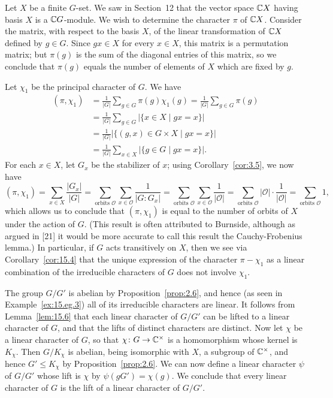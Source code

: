 \documentclass[../Odyssey_Project.tex]{subfiles}
\begin{document}
\begin{example}
\label{ex:15.eg.4}
Let $X$ be a finite $G$-set. We saw in Section~12 that the vector space $\mathbb{C} X$ having basis $X$ is a $\mathbb{C} G$-module. We wish to determine the character $\pi$ of $\mathbb{C} X$. Consider the matrix, with respect to the basis $X$, of the linear transformation of $\mathbb{C} X$ defined by $g \in G$. Since $gx \in X$ for every $x \in X$, this matrix is a permutation matrix; but $\pi(g)$ is the sum of the diagonal entries of this matrix, so we conclude that $\pi(g)$ equals the number of elements of $X$ which are fixed by $g$.

Let $\chi_1$ be the principal character of $G$. We have
\begin{align*}
    (\pi, \chi_1) &= \frac{1}{|G|}\sum_{g \in G} \pi(g)\chi_1(g) = \frac{1}{|G|}\sum_{g \in G} \pi(g) \\
    &= \frac{1}{|G|}\sum_{g \in G} |\{x \in X \mid gx = x\}| \\
    &= \frac{1}{|G|}|\{(g, x) \in G \times X \mid gx = x\}| \\
    &= \frac{1}{|G|}\sum_{x \in X} |\{g \in G \mid gx = x\}|.
\end{align*}
For each $x \in X$, let $G_x$ be the stabilizer of $x$; using Corollary~\ref{cor:3.5}, we now have
\[
    (\pi, \chi_1) = \sum_{x \in X} \frac{|G_x|}{|G|} = \sum_{\text{orbits } \mathcal{O}} \sum_{x \in \mathcal{O}} \frac{1}{|G : G_x|} = \sum_{\text{orbits } \mathcal{O}} \sum_{x \in \mathcal{O}} \frac{1}{|\mathcal{O}|} = \sum_{\text{orbits } \mathcal{O}} |\mathcal{O}| \cdot \frac{1}{|\mathcal{O}|} = \sum_{\text{orbits } \mathcal{O}} 1,
\]
which allows us to conclude that $(\pi, \chi_1)$ is equal to the number of orbits of $X$ under the action of $G$. (This result is often attributed to Burnside, although as argued in [21] it would be more accurate to call this result the Cauchy-Frobenius lemma.) In particular, if $G$ acts transitively on $X$, then we see via Corollary~\ref{cor:15.4} that the unique expression of the character $\pi - \chi_1$ as a linear combination of the irreducible characters of $G$ does not involve $\chi_1$.
\end{example}

\begin{example}
\label{ex:15.eg.5}
The group $G/G'$ is abelian by Proposition~\ref{prop:2.6}, and hence (as seen in Example~\ref{ex:15.eg.3}) all of its irreducible characters are linear. It follows from Lemma~\ref{lem:15.6} that each linear character of $G/G'$ can be lifted to a linear character of $G$, and that the lifts of distinct characters are distinct. Now let $\chi$ be a linear character of $G$, so that $\chi\colon G \to \mathbb{C}^\times$ is a homomorphism whose kernel is $K_\chi$. Then $G/K_\chi$ is abelian, being isomorphic with $X$, a subgroup of $\mathbb{C}^\times$, and hence $G' \leq K_\chi$ by Proposition~\ref{prop:2.6}. We can now define a linear character $\psi$ of $G/G'$ whose lift is $\chi$ by $\psi(gG') = \chi(g)$. We conclude that every linear character of $G$ is the lift of a linear character of $G/G'$.
\end{example}
\end{document}
